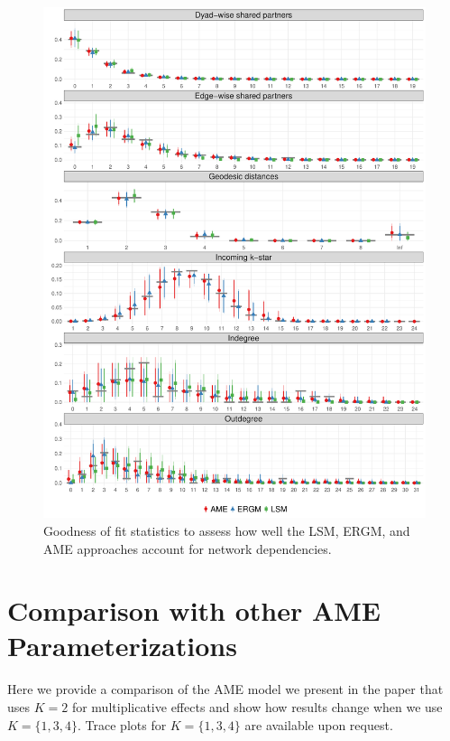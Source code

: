 \documentclass[12pt,pdflatex]{elsarticle}
\begin{document}
\begin{figure}[ht]
	\centering
	\includegraphics[width=1\textwidth]{ggGofAll}
	\caption{Goodness of fit statistics to assess how well the LSM, ERGM, and AME approaches account for network dependencies.}
	\label{fig:gofAll}
\end{figure}
\FloatBarrier

\clearpage
\section*{Comparison with other AME Parameterizations}
\label{sec:ameVsAmeAppendix}

Here we provide a comparison of the AME model we present in the paper that uses $K=2$ for multiplicative effects and show how results change when we use $K=\{1,3,4\}$. Trace plots for $K=\{1,3,4\}$ are available upon request.
\end{document}
